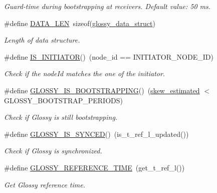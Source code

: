 \begin{DoxyCompactItemize}
\begin{DoxyCompactList}\small\item\em Guard-\/time during bootstrapping at receivers. Default value: 50 ms. \end{DoxyCompactList}\item 
\hypertarget{group__glossy-test-defines_gaf02e45f15080b8ec9dd7b286157617ff}{
\#define \hyperlink{group__glossy-test-defines_gaf02e45f15080b8ec9dd7b286157617ff}{DATA\_\-LEN}~sizeof(\hyperlink{structglossy__data__struct}{glossy\_\-data\_\-struct})}
\label{group__glossy-test-defines_gaf02e45f15080b8ec9dd7b286157617ff}

\begin{DoxyCompactList}\small\item\em Length of data structure. \end{DoxyCompactList}\item 
\hypertarget{group__glossy-test-defines_ga3d1e7d432a1b08c6c103a999b1dc76df}{
\#define \hyperlink{group__glossy-test-defines_ga3d1e7d432a1b08c6c103a999b1dc76df}{IS\_\-INITIATOR}()~(node\_\-id == INITIATOR\_\-NODE\_\-ID)}
\label{group__glossy-test-defines_ga3d1e7d432a1b08c6c103a999b1dc76df}

\begin{DoxyCompactList}\small\item\em Check if the nodeId matches the one of the initiator. \end{DoxyCompactList}\item 
\#define \hyperlink{group__glossy-test-defines_ga56eff93cc86164ca823e6853c8dbf8a1}{GLOSSY\_\-IS\_\-BOOTSTRAPPING}()~(\hyperlink{group__glossy-test-variables-sched-sync_ga8f7aae7ff4364a1481312cef44f65f73}{skew\_\-estimated} $<$ GLOSSY\_\-BOOTSTRAP\_\-PERIODS)
\begin{DoxyCompactList}\small\item\em Check if Glossy is still bootstrapping. \end{DoxyCompactList}\item 
\#define \hyperlink{group__glossy-test-defines_ga7d8d6a2abc29e1ea1ade49600faa5cfc}{GLOSSY\_\-IS\_\-SYNCED}()~(is\_\-t\_\-ref\_\-l\_\-updated())
\begin{DoxyCompactList}\small\item\em Check if Glossy is synchronized. \end{DoxyCompactList}\item 
\#define \hyperlink{group__glossy-test-defines_ga3eab42e5e2d60ea806b4c22447a9fb85}{GLOSSY\_\-REFERENCE\_\-TIME}~(get\_\-t\_\-ref\_\-l())
\begin{DoxyCompactList}\small\item\em Get Glossy reference time. \end{DoxyCompactList}\end{DoxyCompactItemize}



